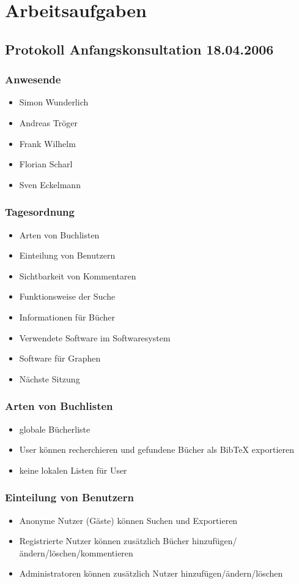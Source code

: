 \chapter{Arbeitsaufgaben}
		\section{Protokoll Anfangskonsultation 18.04.2006}
		\subsection{Anwesende}
		\begin{itemize}
			\item Simon Wunderlich
			\item Andreas Tröger
			\item Frank Wilhelm
			\item Florian Scharl
			\item Sven Eckelmann
		\end{itemize}
		\subsection{Tagesordnung}
		\begin{itemize}
			\item Arten von Buchlisten
			\item Einteilung von Benutzern
			\item Sichtbarkeit von Kommentaren
			\item Funktionsweise der Suche
			\item Informationen für Bücher
			\item Verwendete Software im Softwaresystem
			\item Software für Graphen
			\item Nächste Sitzung
		\end{itemize}
			\subsection{Arten von Buchlisten}
			\begin{itemize}
				\item globale Bücherliste
				\item User können recherchieren und gefundene Bücher als BibTeX exportieren
				\item keine lokalen Listen für User
			\end{itemize}
			\subsection{Einteilung von Benutzern}
			\begin{itemize}
				\item Anonyme Nutzer (Gäste) können Suchen und Exportieren
				\item Registrierte Nutzer können zusätzlich Bücher hinzufügen/ändern/löschen/kommentieren
				\item Administratoren können zusätzlich Nutzer hinzufügen/ändern/löschen
			\end{itemize}
